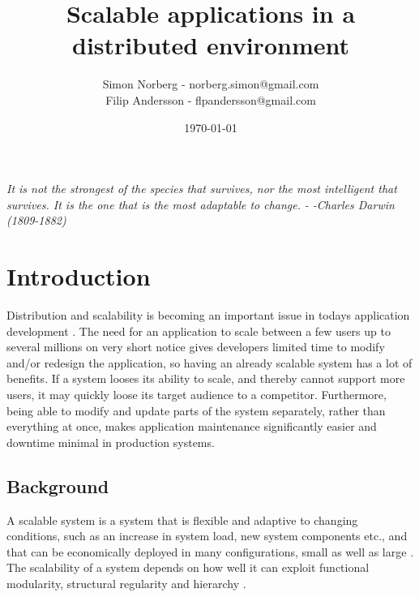 \documentclass{article}
\begin{document}

\title{Scalable applications in a distributed environment}
\author{Simon Norberg - norberg.simon@gmail.com\\
        Filip Andersson - flpandersson@gmail.com }
\date{\today}
\maketitle

\newpage
\begin{flushright}
\large{\emph{It is not the strongest of the species that survives, nor the most 
intelligent that survives. It is the one that is the most adaptable to change.}
\newline
\emph{- -Charles Darwin (1809-1882)}}
\end{flushright}
\newpage
 
 
\section{Introduction}

Distribution and scalability is becoming an important issue in todays
application development \cite{rellermeyer2007services}.
The need for an application to scale between a few users up to several millions 
on very short notice gives developers limited time to modify and/or redesign 
the application, so having an already scalable system has a lot of benefits. 
If a system looses its ability to scale, and thereby cannot support more users, 
it may quickly loose its target audience to a competitor. Furthermore, being able 
to modify and update parts of the system separately, rather than everything at 
once, makes application maintenance significantly easier and downtime minimal 
in production systems.

\subsection{Background}

A scalable system is a system that is flexible and adaptive to changing
conditions, such as an increase in system load, new system components etc., and
that can be economically deployed in many configurations, small as well as
large \cite{jogalekar2000evaluating}. The scalability of a system depends on
how well it can exploit functional modularity, structural regularity and
hierarchy \cite{lipson2007principles}.
\end{document}
